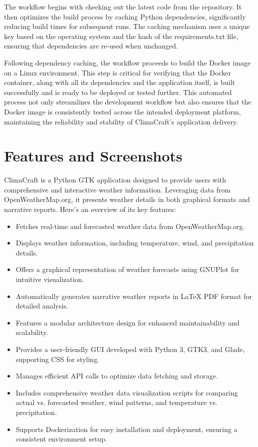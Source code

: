 \documentclass[sn-mathphys-num]{sn-jnl}%
\begin{document}
The workflow begins with checking out the latest code from the repository. It then optimizes the build process by caching Python dependencies, significantly reducing build times for subsequent runs. The caching mechanism uses a unique key based on the operating system and the hash of the requirements.txt file, ensuring that dependencies are re-used when unchanged.

Following dependency caching, the workflow proceeds to build the Docker image on a Linux environment. This step is critical for verifying that the Docker container, along with all its dependencies and the application itself, is built successfully and is ready to be deployed or tested further. This automated process not only streamlines the development workflow but also ensures that the Docker image is consistently tested across the intended deployment platform, maintaining the reliability and stability of ClimaCraft's application delivery.

\section{Features and Screenshots}\label{sec4}

ClimaCraft is a Python GTK application designed to provide users with comprehensive and interactive weather information. Leveraging data from OpenWeatherMap.org, it presents weather details in both graphical formats and narrative reports. Here's an overview of its key features:
\begin{itemize}
    \item Fetches real-time and forecasted weather data from OpenWeatherMap.org.
    \item Displays weather information, including temperature, wind, and precipitation details.
    \item Offers a graphical representation of weather forecasts using GNUPlot for intuitive visualization.
    \item Automatically generates narrative weather reports in LaTeX PDF format for detailed analysis.
    \item Features a modular architecture design for enhanced maintainability and scalability.
    \item Provides a user-friendly GUI developed with Python 3, GTK3, and Glade, supporting CSS for styling.
    \item Manages efficient API calls to optimize data fetching and storage.
    \item Includes comprehensive weather data visualization scripts for comparing actual vs. forecasted weather, wind patterns, and temperature vs. precipitation.
    \item Supports Dockerization for easy installation and deployment, ensuring a consistent environment setup.
\end{itemize}
\end{document}
